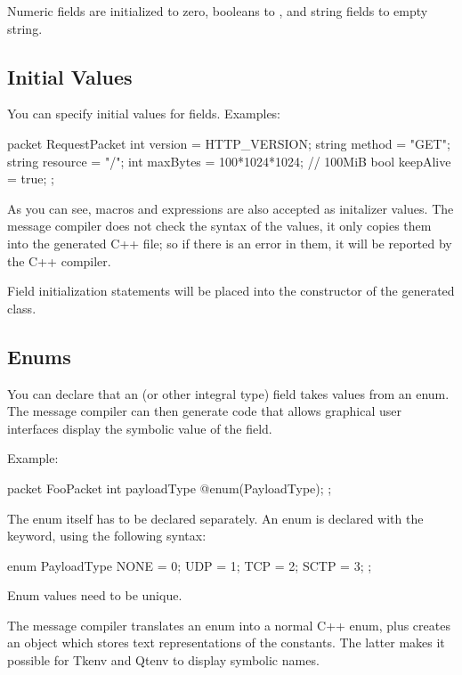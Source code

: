 Numeric fields are initialized to zero, booleans to , and string
fields to empty string.


\subsection{Initial Values}
\label{sec:msg-defs:initial-values}

You can specify initial values for fields. Examples:

\begin{msg}
packet RequestPacket
{
    int version = HTTP_VERSION;
    string method = "GET";
    string resource = "/";
    int maxBytes = 100*1024*1024; // 100MiB
    bool keepAlive = true;
};
\end{msg}

As you can see, macros and expressions are also accepted as initalizer
values. The message compiler does not check the syntax of the values, it
only copies them into the generated C++ file; so if there is an error in
them, it will be reported by the C++ compiler.

Field initialization statements will be placed into the constructor of the
generated class.


\subsection{Enums}
\label{sec:msg-defs:enums}

You can declare that an  (or other integral type) field
takes values from an enum. The message compiler can then generate code
that allows graphical user interfaces display the symbolic value of the field.

Example:

\begin{msg}
packet FooPacket
{
    int payloadType @enum(PayloadType);
};
\end{msg}

The enum itself has to be declared separately. An enum is declared with
the  keyword, using the following syntax:

\begin{msg}
enum PayloadType
{
   NONE = 0;
   UDP = 1;
   TCP = 2;
   SCTP = 3;
};
\end{msg}

Enum values need to be unique.

The message compiler translates an enum into a normal C++ enum, plus
creates an object which stores text representations of the constants. The
latter makes it possible for Tkenv and Qtenv to display symbolic names.

